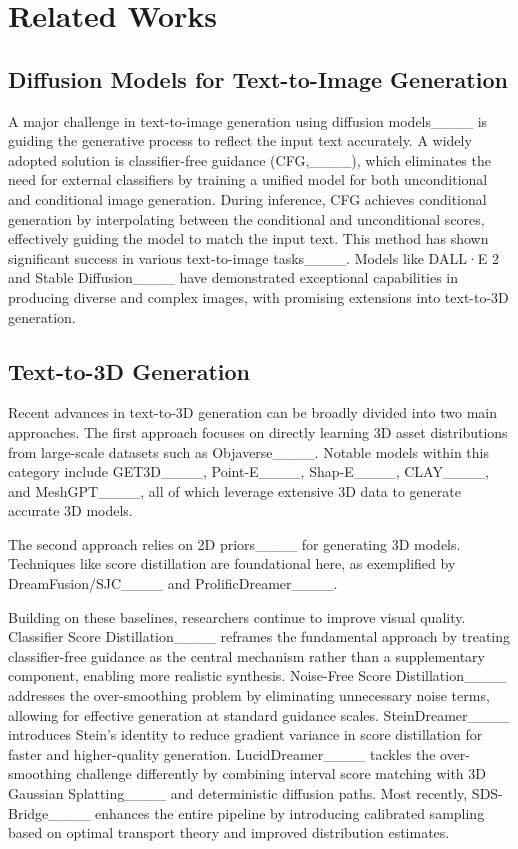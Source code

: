 \section{Related Works}
\subsection{Diffusion Models for Text-to-Image Generation}
A major challenge in text-to-image generation using diffusion models____ is guiding the generative process to reflect the input text accurately. A widely adopted solution is classifier-free guidance (CFG,____), which eliminates the need for external classifiers by training a unified model for both unconditional and conditional image generation. During inference, CFG achieves conditional generation by interpolating between the conditional and unconditional scores, effectively guiding the model to match the input text. This method has shown significant success in various text-to-image tasks____. Models like DALL·E 2 and Stable Diffusion____ have demonstrated exceptional capabilities in producing diverse and complex images, with promising extensions into text-to-3D generation.

\subsection{Text-to-3D Generation}
Recent advances in text-to-3D generation can be broadly divided into two main approaches. The first approach focuses on directly learning 3D asset distributions from large-scale datasets such as Objaverse____. Notable models within this category include GET3D____, Point-E____, Shap-E____, CLAY____, and MeshGPT____, all of which leverage extensive 3D data to generate accurate 3D models.

The second approach relies on 2D priors____ for generating 3D models. Techniques like score distillation are foundational here, as exemplified by DreamFusion/SJC____ and ProlificDreamer____.

Building on these baselines, researchers continue to improve visual quality. Classifier Score Distillation____ reframes the fundamental approach by treating classifier-free guidance as the central mechanism rather than a supplementary component, enabling more realistic synthesis. Noise-Free Score Distillation____ addresses the over-smoothing problem by eliminating unnecessary noise terms, allowing for effective generation at standard guidance scales. SteinDreamer____ introduces Stein's identity to reduce gradient variance in score distillation for faster and higher-quality generation. LucidDreamer____ tackles the over-smoothing challenge differently by combining interval score matching with 3D Gaussian Splatting____ and deterministic diffusion paths. Most recently, SDS-Bridge____ enhances the entire pipeline by introducing calibrated sampling based on optimal transport theory and improved distribution estimates.

